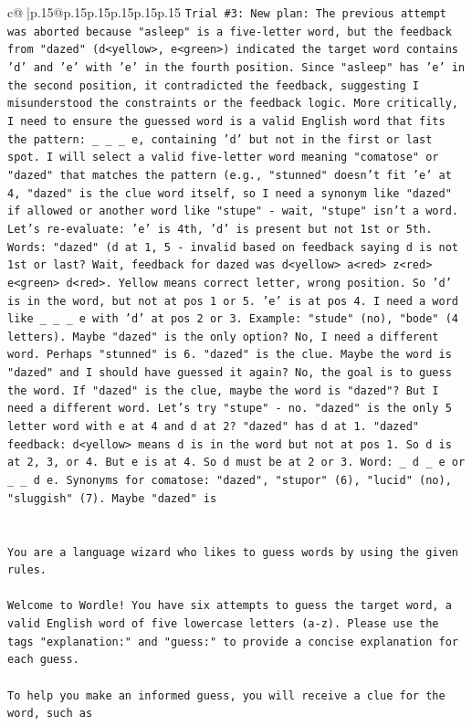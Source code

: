 \documentclass{article}
\begin{document}
{\begin{supertabular}{c@{$\;$}|p{.15\linewidth}@{}p{.15\linewidth}p{.15\linewidth}p{.15\linewidth}p{.15\linewidth}p{.15\linewidth}}
{{{\texttt{Trial \#3: New plan: The previous attempt was aborted because "asleep" is a five{-}letter word, but the feedback from "dazed" (d<yellow>, e<green>) indicated the target word contains 'd' and 'e' with 'e' in the fourth position. Since "asleep" has 'e' in the second position, it contradicted the feedback, suggesting I misunderstood the constraints or the feedback logic. More critically, I need to ensure the guessed word is a valid English word that fits the pattern: \_ \_ \_ e, containing 'd' but not in the first or last spot. I will select a valid five{-}letter word meaning "comatose" or "dazed" that matches the pattern (e.g., "stunned" doesn't fit 'e' at 4, "dazed" is the clue word itself, so I need a synonym like "dazed" if allowed or another word like "stupe" {-} wait, "stupe" isn't a word. Let's re{-}evaluate: 'e' is 4th, 'd' is present but not 1st or 5th. Words: "dazed" (d at 1, 5 {-} invalid based on feedback saying d is not 1st or last? Wait, feedback for dazed was d<yellow> a<red> z<red> e<green> d<red>. Yellow means correct letter, wrong position. So 'd' is in the word, but not at pos 1 or 5. 'e' is at pos 4. I need a word like \_ \_ \_ e with 'd' at pos 2 or 3. Example: "stude" (no), "bode" (4 letters). Maybe "dazed" is the only option? No, I need a different word. Perhaps "stunned" is 6. "dazed" is the clue. Maybe the word is "dazed" and I should have guessed it again? No, the goal is to guess the word. If "dazed" is the clue, maybe the word is "dazed"? But I need a different word. Let's try "stupe" {-} no. "dazed" is the only 5 letter word with e at 4 and d at 2? "dazed" has d at 1. "dazed" feedback: d<yellow> means d is in the word but not at pos 1. So d is at 2, 3, or 4. But e is at 4. So d must be at 2 or 3. Word: \_ d \_ e or \_ \_ d e. Synonyms for comatose: "dazed", "stupor" (6), "lucid" (no), "sluggish" (7). Maybe "dazed" is} \\
\\ 
\\ 
\texttt{You are a language wizard who likes to guess words by using the given rules.} \\
\\ 
\texttt{Welcome to Wordle! You have six attempts to guess the target word, a valid English word of five lowercase letters (a{-}z). Please use the tags "explanation:" and "guess:" to provide a concise explanation for each guess.} \\
\\ 
\texttt{To help you make an informed guess, you will receive a clue for the word, such as} \\
}}}
\end{supertabular}}
\end{document}
